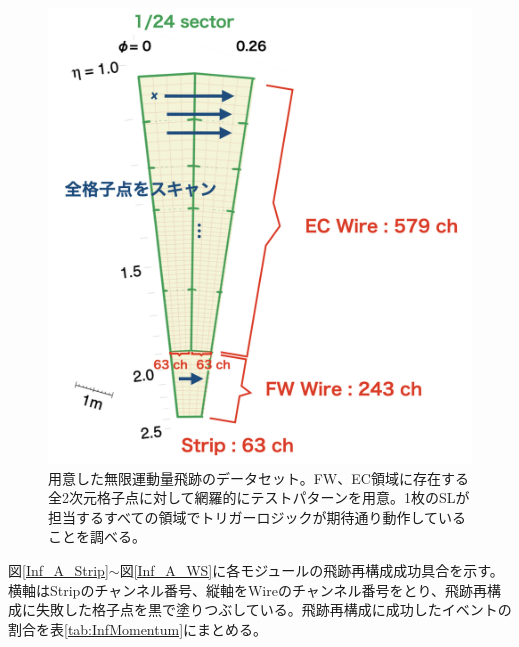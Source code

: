 \begin{figure} 
\centering
\includegraphics[width=16cm]{fig/Test/InfMomentum.png}
\caption[用意した無限運動量飛跡のデータセット]{用意した無限運動量飛跡のデータセット。FW、EC領域に存在する全2次元格子点に対して網羅的にテストパターンを用意。1枚のSLが担当するすべての領域でトリガーロジックが期待通り動作していることを調べる。}
\label{InfMomentum}
\end{figure}

図\ref{Inf_A_Strip}$\sim$図\ref{Inf_A_WS}に各モジュールの飛跡再構成成功具合を示す。横軸はStripのチャンネル番号、縦軸をWireのチャンネル番号をとり、飛跡再構成に失敗した格子点を黒で塗りつぶしている。飛跡再構成に成功したイベントの割合を表\ref{tab:InfMomentum}にまとめる。

